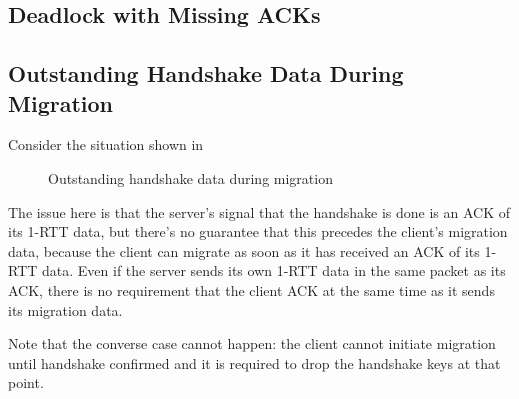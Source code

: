\documentclass{article}
\begin{document}
\subsection{Deadlock with Missing ACKs}
\label{sec:deadl-with-miss}



\subsection{Outstanding Handshake Data During Migration}
\label{sec:outst-handsh-data}

Consider the situation shown in 
\begin{figure}[H]
\begin{center}
\end{center}
\caption{Outstanding handshake data during migration}
\label{fig:outstanding-handshake-migration}
\end{figure}

The issue here is that the server's signal that the handshake
is done is an ACK of its 1-RTT data, but there's no guarantee
that this precedes the client's migration data, because the
client can migrate as soon as it has received an ACK of its
1-RTT data. Even if the server sends its own 1-RTT data in
the same packet as its ACK, there is no requirement that
the client ACK at the same time as it sends its migration
data.

Note that the converse case cannot happen: the client cannot
initiate migration until handshake confirmed and it is required
to drop the handshake keys at that point.
\end{document}
